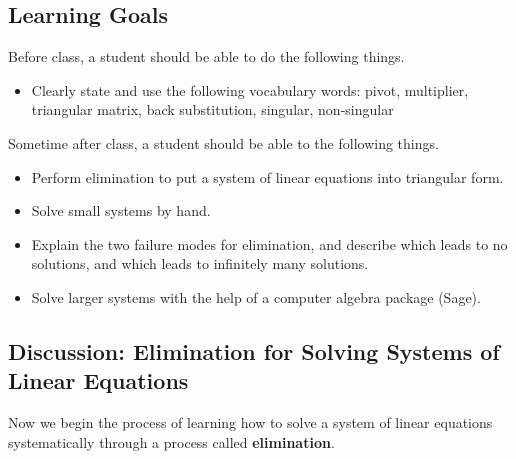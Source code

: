 \documentclass[10pt,]{book}
\newcommand{\terminology}[1]{\textbf{#1}}
\theoremstyle{plain}
\theoremstyle{definition}
\numberwithin{equation}{section}
\begin{document}
\subsection[Learning Goals]{Learning Goals}\label{subsection-25}

      Before class, a student should be able to do the following things.
\begin{itemize}
\item{}Clearly state and use the following vocabulary words: pivot, multiplier,
        triangular matrix, back substitution, singular, non-singular
      \end{itemize}
\par

      Sometime after class, a student should be able to the following things.
\begin{itemize}
\item{}Perform elimination to put a system of linear equations into triangular form.\item{}Solve small systems by hand.\item{}Explain the two failure modes for elimination, and describe which leads to
        no solutions, and which leads to infinitely many solutions.\item{}Solve larger systems with the help of a computer algebra package (Sage).\end{itemize}
\typeout{************************************************}
\typeout{************************************************}
\subsection[Discussion: Elimination for Solving Systems of Linear Equations]{Discussion: Elimination for Solving Systems of Linear Equations}\label{subsection-26}

        Now we begin the process of learning how to solve a system of linear
        equations systematically through a process called \terminology{elimination}.
\typeout{************************************************}
\typeout{************************************************}
\end{document}
